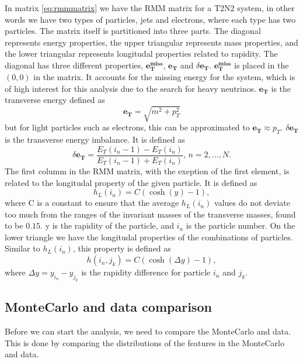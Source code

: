 In matrix \ref{eq:rmmmatrix} we have the RMM matrix for a T2N2 system, in other words we have two types of particles, jets and electrons, where each type has
two particles. The matrix itself is partitioned into three parts. The diagonal represents energy properties, the upper triangular represents mass properties, 
and the lower triangular represents longitudal properties related to rapidity. The diagonal has three different properties, $\boldsymbol{e_T^{miss}}$, $\boldsymbol{e_T}$ and $\delta\boldsymbol{e_T}$. 
$\boldsymbol{e_T^{miss}}$ is placed in the $(0,0)$ in the matrix. It accounts for the missing energy for the system, which is of high interest for this analysis due to
the search for heavy neutrinos. $\boldsymbol{e_T}$ is the transverse energy defined as 
\begin{equation*}
    \boldsymbol{e_T} = \sqrt{m^2 + p_T^2}
\end{equation*}
but for light particles such as electrons, this can be approximated to $\boldsymbol{e_T} \approx p_T$. $\delta\boldsymbol{e_T}$ is the transverse energy imbalance.
It is defined as 
\begin{equation*}
    \delta\boldsymbol{e_T} = \frac{E_T(i_n-1) - E_T(i_n)}{E_T(i_n-1) + E_T(i_n)}, \, n = 2, ..., N.
\end{equation*}
The first columm in the RMM matrix, with the exeption of the first element, is related to the longitudal property of the given particle. 
It is defined as
\begin{equation*}
    h_L(i_n) = C(\cosh{(y)} - 1),
\end{equation*}
where C is a constant to ensure that the average $h_L(i_n)$ values do not deviate too much from the ranges of the invariant masses of the transverse masses, found to be $0.15$\cite{Chekanov_2019}. 
y is the rapidity of the particle, and $i_n$ is the particle number. On the lower triangle we have the longitudal properties of the combinations of particles. Similar to $h_L(i_n)$,
this property is defined as 
\begin{equation*}
    h(i_n, j_k) = C(\cosh{(\Delta y)} - 1),
\end{equation*}
where $\Delta y = y_{i_n} - y_{j_k}$ is the rapidity difference for particle $i_n$ and $j_k$.


\subsection*{MonteCarlo and data comparison}

Before we can start the analysis, we need to compare the MonteCarlo and data. This is done by comparing the distributions of the features in the MonteCarlo and data.

